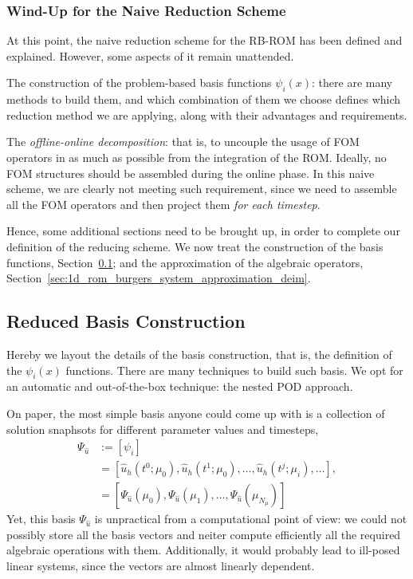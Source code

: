 \documentclass[../../thesis.tex]{subfiles}
\begin{document}
\subsubsection{Wind-Up for the Naive Reduction Scheme}
At this point, the naive reduction scheme for the RB-ROM has been defined and explained.
However, some aspects of it remain unattended.

The construction of the problem-based basis functions $\psi_i(x)$:
there are many methods to build them, and which combination of them we choose 
defines which reduction method we are applying, along with their advantages and requirements.

The \emph{offline-online decomposition}: 
that is, to uncouple the usage of FOM operators in as much as possible from the integration of the ROM. 
Ideally, no FOM structures should be assembled during the online phase.
In this naive scheme, we are clearly not meeting such requirement, since we need to assemble all the FOM operators and then project them \emph{for each timestep}.

Hence, some additional sections need to be brought up, in order to complete our definition of the reducing scheme.
We now treat the construction of the basis functions, Section~\ref{sec:1d_rom_burgers_basis_construction}; and the approximation of the algebraic operators, Section~\ref{sec:1d_rom_burgers_system_approximation_deim}.

\subsection{Reduced Basis Construction}
\label{sec:1d_rom_burgers_basis_construction}
Hereby we layout the details of the basis construction, that is, the definition of the $\psi_i(x)$ functions.
There are many techniques to build such basis.
We opt for an automatic and out-of-the-box technique: the nested POD approach. 

On paper, the most simple basis anyone could come up with is a collection of solution snaphsots for different parameter values and timesteps, 
\begin{align}
    \Psi_{\hat{u}} &:= [\psi_i] \nonumber \\
    &= [\hat{u}_h(t^0; \mu_0), \hat{u}_h(t^1; \mu_0), 
    \ldots, \hat{u}_h(t^j; \mu_i), \ldots], \nonumber \\
    &= [\Psi_{\hat{u}}(\mu_0), \Psi_{\hat{u}}(\mu_1), \ldots, \Psi_{\hat{u}}(\mu_{N_{\mu}})]
\end{align}
Yet, this basis $\Psi_{\hat{u}}$ is unpractical from a computational point of view: we could not possibly store all the basis vectors and neiter compute efficiently all the required algebraic operations with them.
Additionally, it would probably lead to ill-posed linear systems, since the vectors are almost linearly dependent. 
\end{document}
